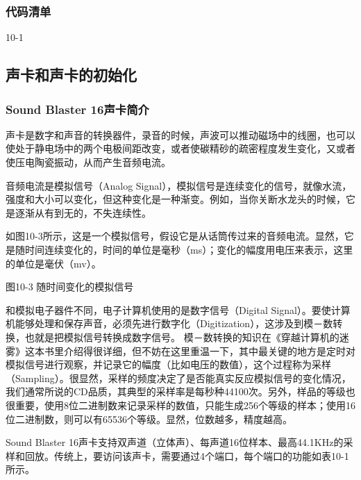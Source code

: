 \documentclass[12pt]{article}
\begin{document}
\begin{CJK}{UTF8}{gbsn}
\subsubsection{代码清单}
%
%

10-1
%

\subsection{声卡和声卡的初始化}
\subsubsection{Sound Blaster 16声卡简介}
声卡是数字和声音的转换器件，录音的时候，声波可以推动磁场中的线圈，也可以使处于静电场中的两个电极间距改变，或者使碳精砂的疏密程度发生变化，又或者使压电陶瓷振动，从而产生音频电流。

音频电流是模拟信号（Analog Signal），模拟信号是连续变化的信号，就像水流，强度和大小可以变化，但这种变化是一种渐变。例如，当你关断水龙头的时候，它是逐渐从有到无的，不失连续性。

如图10-3所示，这是一个模拟信号，假设它是从话筒传过来的音频电流。显然，它是随时间连续变化的，时间的单位是毫秒（ms）；变化的幅度用电压来表示，这里的单位是毫伏（mv）。
 
图10-3  随时间变化的模拟信号

和模拟电子器件不同，电子计算机使用的是数字信号（Digital Signal）。要使计算机能够处理和保存声音，必须先进行数字化（Digitization），这涉及到模－数转换，也就是把模拟信号转换成数字信号。
模－数转换的知识在《穿越计算机的迷雾》这本书里介绍得很详细，但不妨在这里重温一下，其中最关键的地方是定时对模拟信号进行观察，并记录它的幅度（比如电压的数值），这个过程称为采样（Sampling）。很显然，采样的频度决定了是否能真实反应模拟信号的变化情况，我们通常所说的CD品质，其典型的采样率是每秒种44100次。另外，样品的等级也很重要，使用8位二进制数来记录采样的数值，只能生成256个等级的样本；使用16位二进制数，则可以有65536个等级。显然，位数越多，精度越高。

Sound Blaster 16声卡支持双声道（立体声）、每声道16位样本、最高44.1KHz的采样和回放。传统上，要访问该声卡，需要通过4个端口，每个端口的功能如表10-1所示。


\end{CJK}
\end{document}

